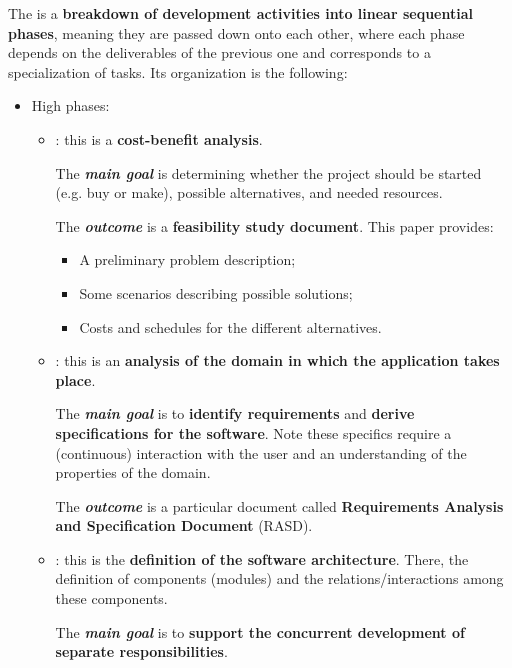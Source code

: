 The  is a \textbf{breakdown of development activities into linear sequential phases}, meaning they are passed down onto each other, where each phase depends on the deliverables of the previous one and corresponds to a specialization of tasks.\cite{bomarius2009product} Its organization is the following:
\begin{itemize}
    \item High phases:
    \begin{itemize}
        \item \underline{}: this is a \textbf{cost-benefit analysis}.
        
        The \textcolor{Red3}{\textbf{\emph{main goal}}} is determining whether the project should be started (e.g. buy or make), possible alternatives, and needed resources. 
        
        The \textcolor{Green4}{\textbf{\emph{outcome}}} is a \textbf{feasibility study document}. This paper provides:
        \begin{itemize}
            \item A preliminary problem description;
            \item Some scenarios describing possible solutions;
            \item Costs and schedules for the different alternatives.
        \end{itemize}


        \item \underline{}: this is an \textbf{analysis of the domain in which the application takes place}. 
        
        The \textcolor{Red3}{\textbf{\emph{main goal}}} is to \textbf{identify requirements} and \textbf{derive specifications for the software}. Note these specifics require a (continuous) interaction with the user and an understanding of the properties of the domain. 
        
        The \textcolor{Green4}{\textbf{\emph{outcome}}} is a particular document called \textbf{Requirements Analysis and Specification Document} (RASD).


        \item \underline{}: this is the \textbf{definition of the software architecture}. There, the definition of components (modules) and the relations/interactions among these components. 
        
        The \textcolor{Red3}{\textbf{\emph{main goal}}} is to \textbf{support the concurrent development of separate responsibilities}. 
        

\end{itemize}
\end{itemize}
